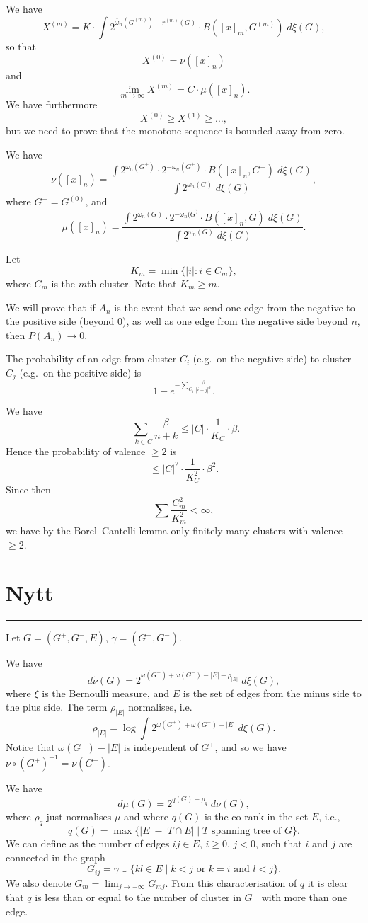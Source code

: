 \documentclass[11pt, a4paper, oneside]{article}
\theoremstyle{definition}
\theoremstyle{remark}
\providecommand{\tl}{\tilde}
\begin{document}
We have 
$$X^{(m)}=K\cdot \int 2^{\overline{\omega}_n(G^{(m)})-r^{(m)}(G)}\cdot B([x]_m, G^{(m)})\; d\xi(G),$$
so that
$$X^{(0)}=\nu([x]_n)$$
and
$$\lim_{m \to \infty} X^{(m)}=C\cdot \mu([x]_n).$$ 
We have furthermore
$$X^{(0)}\geq X^{(1)}\geq \ldots,$$
but we need to prove that the monotone sequence is bounded away from zero.

We have
$$\nu([x]_n)=\frac{ \int 2^{\omega_n(G^+)}\cdot 2^{-\omega_n(G^+)}\cdot B([x]_n, G^+)\; d\xi(G)}{\int 2^{\omega_n(G)} \; d\xi(G)  },$$
where $G^+=G^{(0)}$, and 
$$\mu([x]_n)=\frac{ \int 2^{\omega_n(G)}\cdot 2^{-\omega_n(G^)}\cdot B([x]_n, G)\; d\xi(G)}{\int 2^{\omega_n(G)} \; d\xi(G)  }.$$



Let 
$$K_m=\min \{|i|: i\in C_m\},$$
where $C_m$ is the $m$th cluster. Note that $K_m\geq m$.

We will prove that if $A_n$ is the event that we send one edge from the negative to the positive side (beyond 0), as well as one edge from the negative side beyond $n$, then $P(A_n)\to 0$.

The probability of an edge from cluster $C_i$ (e.g.\ on the negative side) to cluster $C_j$ (e.g.\ on the positive side) is
$$1-e^{-\sum_{C_i} \frac{\beta}{|i-j|^{\alpha}}}.$$ 

We have
$$\sum_{-k\in C}\frac{\beta}{n+k}\leq |C|\cdot \frac{1}{K_C}\cdot \beta.$$
Hence the probability of valence $\geq 2$ is 
$$\leq  |C|^2\cdot \frac{1}{K_C^2}\cdot \beta^2.$$
Since then
$$\sum \frac{C_m^2}{K_m^2}<\infty,$$
we have by the Borel--Cantelli lemma only finitely many clusters with valence $\geq 2$.





\section{Nytt}
\hrule 

Let $G=(G^+, G^- , E)$, $\gamma=(G^+,G^-)$.

We have
$$d\tl\nu(G)=2^{\omega(G^+)+\omega(G^-)-|E|-\rho_{|E|}}\; d\xi(G),$$
where $\xi$ is the Bernoulli measure, and $E$ is the set of edges from the minus side to the plus side. The term $\rho_{|E|}$ normalises, i.e.\ 
\[
\rho_{|E|} = 
\log \int 2^{\omega(G^+)+\omega(G^-)-|E|}\; d\xi(G).
\]
Notice that
$\omega(G^-)-|E|$ is independent of $G^+$, and so we have $\nu\circ (G^+)^{-1}=\nu(G^+)$.

We have 
$$d\mu(G)=2^{q(G)-\rho_q}\; d\nu(G),$$
where $\rho_q$ just normalises $\mu$ and where $q(G)$ is the co-rank in the set $E$, i.e., 
$$
q(G)=\max \{|E|-|T\cap E|\mid \text{$T$ spanning tree of $G$} \}.
$$
We can define as the number of edges $ij\in E$, $i\ge 0$, $j<0$, such that $i$ and $j$ are connected in the graph 
$$ G_{ij} =  \gamma \cup 
\{ kl\in E \mid k < j \text{ or } k=i \text{ and } l<j \}.
$$
We also denote $G_m = \lim_{j\to-\infty} G_{mj}$. From this characterisation
of $q$ it is clear that $q$ is less than or equal to the number of cluster in $G^-$ with more than one edge.
\end{document}
